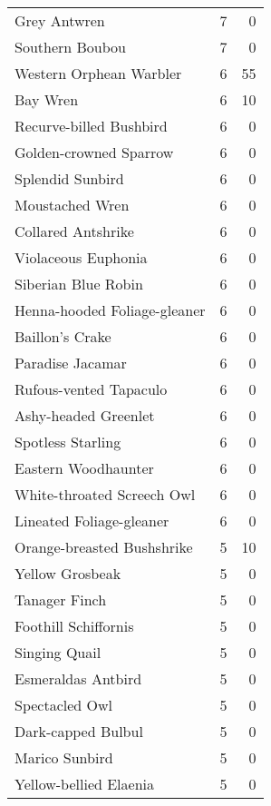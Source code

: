 \begin{longtable}{l r r}
Grey Antwren                    &7    &0     \\
Southern Boubou                 &7    &0     \\
Western Orphean Warbler         &6    &55    \\
Bay Wren                        &6    &10    \\
Recurve-billed Bushbird         &6    &0     \\
Golden-crowned Sparrow          &6    &0     \\
Splendid Sunbird                &6    &0     \\
Moustached Wren                 &6    &0     \\
Collared Antshrike              &6    &0     \\
Violaceous Euphonia             &6    &0     \\
Siberian Blue Robin             &6    &0     \\
Henna-hooded Foliage-gleaner    &6    &0     \\
Baillon's Crake                 &6    &0     \\
Paradise Jacamar                &6    &0     \\
Rufous-vented Tapaculo          &6    &0     \\
Ashy-headed Greenlet            &6    &0     \\
Spotless Starling               &6    &0     \\
Eastern Woodhaunter             &6    &0     \\
White-throated Screech Owl      &6    &0     \\
Lineated Foliage-gleaner        &6    &0     \\
Orange-breasted Bushshrike      &5    &10    \\
Yellow Grosbeak                 &5    &0     \\
Tanager Finch                   &5    &0     \\
Foothill Schiffornis            &5    &0     \\
Singing Quail                   &5    &0     \\
Esmeraldas Antbird              &5    &0     \\
Spectacled Owl                  &5    &0     \\
Dark-capped Bulbul              &5    &0     \\
Marico Sunbird                  &5    &0     \\
Yellow-bellied Elaenia          &5    &0     \\

\end{longtable}
